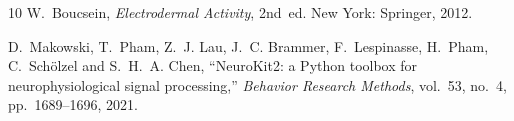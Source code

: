 \documentclass[11pt,a4paper]{article}
\begin{document}
\begin{thebibliography}{10}
W.~Boucsein, \emph{Electrodermal Activity}, 2nd~ed. New York: Springer,
2012.

D.~Makowski, T.~Pham, Z.~J. Lau, J.~C. Brammer, F.~Lespinasse, H.~Pham,
C.~Sch\"olzel and S.~H.~A. Chen, ``NeuroKit2: a Python toolbox for
neurophysiological signal processing,'' \emph{Behavior Research Methods},
vol.~53, no.~4, pp.~1689--1696, 2021.

\end{thebibliography}
\end{document}
